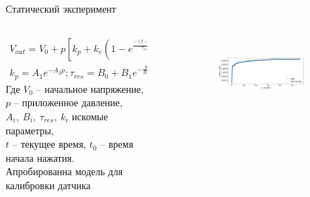 \documentclass[aspectratio=169,xcolor=table,10pt]{beamer}
\begin{document}
\begin{frame}[t]{Статический эксперимент}
    \begin{columns}[T,onlytextwidth]
        \begin{column}{0.52\textwidth}
            \begin{eqnarray*}
                V_{out} = V_0 + p[k_p + k_e(1-e^\frac{-(t-t_0)}{\tau_{res}})](1-e^{-\frac{A}{p}}) \\
                k_p = A_1e^{-A_2p}; \tau_{res} = B_0 + B_1e^{-\frac{p}{B_2}}
            \end{eqnarray*}
            Где $V_0$ -- начальное напряжение, \\ $p$ -- приложенное давление, \\ $A_i,\ B_i,\ \tau_{res},\ k_i$ искомые параметры, \\  $t$ -- текущее время, $t_0$ -- время начала нажатия.
            \\ \alert{Апробированна модель для калибровки датчика}
        \end{column}
        \begin{column}{0.45\textwidth}
            \vspace{-15pt}
            \begin{figure}[H]
                \begin{subfigure}{0.99\textwidth}
                    \centering\includegraphics[height=2.8cm,width=1\textwidth,keepaspectratio]{least_square_model.png}
                    \label{fig:least_square_model.png}
                \end{subfigure}
                \vspace{-1cm}


\end{figure}
\end{column}
\end{columns}
\end{frame}
\end{document}
